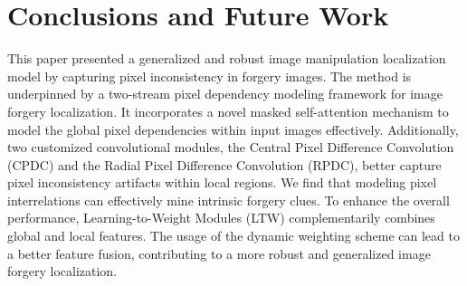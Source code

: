 \documentclass[10pt,journal,compsoc]{IEEEtran}
\begin{document}



\section{Conclusions and Future Work}
This paper presented a generalized and robust image manipulation localization model by capturing pixel inconsistency in forgery images. The method is underpinned by a two-stream pixel dependency modeling framework for image forgery localization. It incorporates a novel masked self-attention mechanism to model the global pixel dependencies within input images effectively. Additionally, two customized convolutional modules, the Central Pixel Difference Convolution (CPDC) and the Radial Pixel Difference Convolution (RPDC), better capture pixel inconsistency artifacts within local regions. We find that modeling pixel interrelations can effectively mine intrinsic forgery clues. To enhance the overall performance, Learning-to-Weight Modules (LTW) complementarily combines global and local features. The usage of the dynamic weighting scheme can lead to a better feature fusion, contributing to a more robust and generalized image forgery localization.
\end{document}
